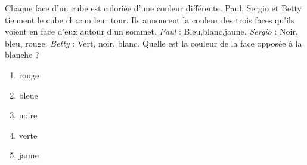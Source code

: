 Chaque face d'un cube est coloriée d'une couleur différente. Paul, Sergio et Betty tiennent le cube chacun leur tour. Ils annoncent la couleur des trois faces qu'ils voient en face d'eux autour d'un sommet. {\em Paul} : \og Bleu,blanc,jaune\fg. {\em Sergio} : \og Noir, bleu, rouge\fg. {\em Betty} : \og Vert, noir, blanc\fg. Quelle est la couleur de la face opposée à la blanche ?
\begin{multicols}{5}
  \begin{enumerate}[A/]
  \item rouge
  \item bleue
  \item noire
  \item verte
  \item jaune
  \end{enumerate}
\end{multicols}